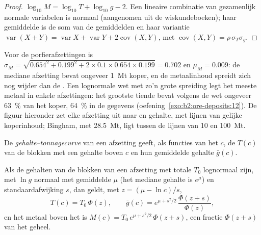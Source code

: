 \begin{proof}
$\log_{10} M = \log_{10} T + \log_{10} g - 2$. Een lineaire combinatie van gezamenlijk normale variabelen is
normaal (aangenomen uit de wiskundeboeken); haar gemiddelde is de som van de gemiddelden en haar variantie
$\operatorname{var}(X + Y) = \operatorname{var} X + \operatorname{var} Y + 2\operatorname{cov}(X, Y)$,
met $\operatorname{cov}(X, Y) = \rho\,\sigma_T\sigma_g$.
\end{proof}

Voor de porfierafzettingen is $\sigma_M = \sqrt{0.654^2 + 0.199^2 + 2 \times 0.1 \times 0.654 \times
0.199} = 0.702$ en $\mu_M = 0.009$: de mediane afzetting bevat ongeveer \qty{1}{Mt} koper, en de
metaalinhoud spreidt zich nog wijder dan de . Een lognormale wet met zo'n grote spreiding
legt het meeste metaal in enkele afzettingen: het grootste tiende bevat volgens de wet ongeveer \qty{63}{\percent} van het
koper, \qty{64}{\percent} in de gegevens (oefening~\ref{exo:b2:ore-deposits:12}). De
figuur hieronder zet elke afzetting uit naar  en gehalte, met lijnen van gelijke koperinhoud;
Bingham, met \qty{28.5}{Mt}, ligt tussen de lijnen van 10 en \qty{100}{Mt}.

\begin{definition}\label{def:b2:ore-deposits:gt}
De \emph{gehalte--tonnagecurve} van een afzetting geeft, als functies van
het  $c$, de  $T(c)$ van de blokken met een gehalte boven $c$ en hun gemiddelde gehalte
$\bar g(c)$.
\end{definition}

\begin{proposition}\label{prop:b2:ore-deposits:gt}
Als de gehalten van de blokken van een afzetting met totale  $T_0$ lognormaal zijn, met $\ln g$ normaal
met gemiddelde $\mu$ (het mediane gehalte is $e^{\mu}$) en standaardafwijking $s$, dan geldt, met $z = (\mu -
\ln c)/s$,
\begin{equation}
T(c) = T_0\,\Phi(z), \qquad
\bar g(c) = e^{\mu + s^2/2}\,\frac{\Phi(z + s)}{\Phi(z)} ,
\label{eq:b2:ore-deposits:gt}
\end{equation}
en het metaal boven het  is $M(c) = T_0\,e^{\mu + s^2/2}\,\Phi(z + s)$, een fractie $\Phi(z +
s)$ van het geheel.
\end{proposition}

